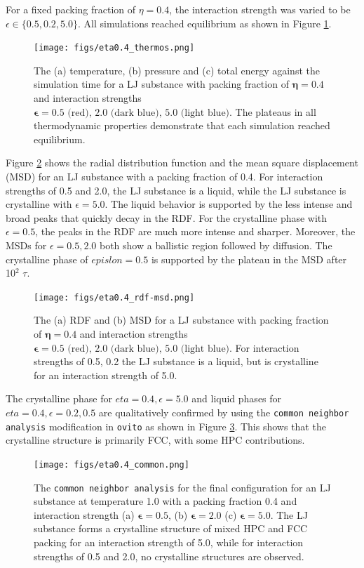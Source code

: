 \documentclass[10pt,a4paper]{labreport}
\begin{document}
For a fixed packing fraction of $\eta = 0.4$, the interaction strength was varied to be $\epsilon\in\{0.5, 0.2, 5.0\}$. All simulations reached equilibrium as shown in Figure \ref{fig:ass2_thermos_eta0.4}. 
\begin{figure}[h]
  \centering
  \texttt{[image: figs/eta0.4\_thermos.png]}
  \caption{The (a) temperature, (b) pressure and (c) total energy against the simulation time for a LJ substance with packing fraction of $\bm{\eta = 0.4}$ and interaction strengths $\bm{\epsilon = 0.5} \text{ (red), } \bm{2.0} \text{ (dark blue), } \bm{5.0}\text{ (light blue)}$. The plateaus in all thermodynamic properties demonstrate that each simulation reached equilibrium.}
  \label{fig:ass2_thermos_eta0.4}
\end{figure}

Figure \ref{fig:ass2_rdf-msd_eta0.4} shows the radial distribution function and the mean square displacement (MSD) for an LJ substance with a packing fraction of 0.4.
For interaction strengths of 0.5 and 2.0, the LJ substance is a liquid, while the LJ substance is crystalline with $\epsilon = 5.0$. 
The liquid behavior is supported by the less intense and broad peaks that quickly decay in the RDF. 
For the crystalline phase with $\epsilon=0.5$, the peaks in the RDF are much more intense and sharper. Moreover, the MSDs for $\epsilon = 0.5,2.0$ both show  a ballistic region followed by diffusion. 
The crystalline phase of $epislon=0.5$ is supported by the plateau in the MSD after 10$^2$ $\tau$. 
\begin{figure}[htbp]
  \centering
  \texttt{[image: figs/eta0.4\_rdf-msd.png]}
  \caption{The (a) RDF and (b) MSD for a LJ substance with packing fraction of $\bm{\eta = 0.4}$ and interaction strengths $\bm{\epsilon = 0.5} \text{ (red), } \bm{2.0} \text{ (dark blue), } \bm{5.0}\text{ (light blue)}$. For interaction strengths of 0.5, 0.2 the LJ substance is a liquid, but is crystalline for an interaction strength of 5.0.}
  \label{fig:ass2_rdf-msd_eta0.4}
\end{figure}

The crystalline phase for $eta=0.4, \epsilon=5.0$ and liquid phases for $eta = 0.4, \epsilon=0.2,0.5$ are qualitatively confirmed by using the \texttt{common neighbor analysis} modification in \texttt{ovito} as shown in Figure \ref{fig:ass2_common_eta0.4}. This shows that the crystalline structure is primarily FCC, with some HPC contributions. 
\begin{figure}[htbp]
  \centering
  \texttt{[image: figs/eta0.4\_common.png]}
  \caption{The \texttt{common neighbor analysis} for the final configuration for an LJ substance at temperature 1.0 with a packing fraction 0.4 and interaction strength (a) $\bm{\epsilon=0.5}$, (b) $\bm{\epsilon=2.0}$ (c) $\bm{\epsilon=5.0}$. The LJ substance forms a crystalline structure of mixed HPC and FCC packing for an interaction strength of 5.0, while for interaction strengths of 0.5 and 2.0, no crystalline structures are observed. }
  \label{fig:ass2_common_eta0.4}
\end{figure} 
\end{document}
